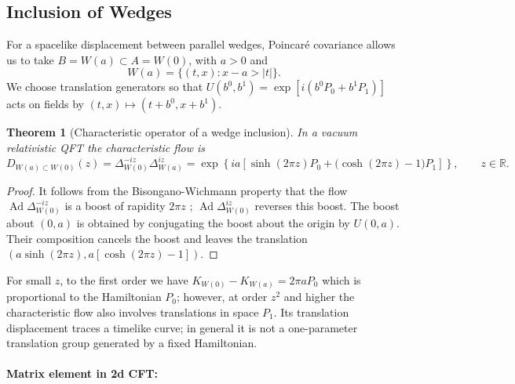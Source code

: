 \documentclass[a4paper,11pt]{article}
\newtheorem{theorem}{Theorem}
\theoremstyle{definition}
\begin{document}
\subsection{Inclusion of Wedges}
\label{subsec:wedge-inclusion}

For a spacelike displacement between parallel wedges, Poincar\'e covariance allows us to take $B=W(a)\subset A=W(0)$, with $a>0$ and
\[
 W(a)=\{(t,x):x-a>|t|\}.
\]
We choose translation generators so that $U(b^0,b^1)=\exp[i(b^0P_0+b^1P_1)]$ acts on fields by $(t,x)\mapsto(t+b^0,x+b^1)$.

\begin{theorem}[Characteristic operator of a wedge inclusion]
\label{thm:wedge-characteristic}
In a vacuum relativistic QFT the characteristic flow is
\begin{equation}
 D_{W(a)\subset W(0)}(z)=\Delta_{W(0)}^{-iz}\Delta_{W(a)}^{iz}
 =\exp\!\left\{ia\left[\sinh(2\pi z)P_0
       +\bigl(\cosh(2\pi z)-1\bigr)P_1\right]\right\},
 \qquad z\in\mathbb R.
 \label{eq:wedge-characteristic}
\end{equation}
\end{theorem}
\begin{proof}
It follows from the Bisongano-Wichmann property that the flow $\operatorname{Ad}\Delta_{W(0)}^{-iz}$ is a boost of rapidity $2\pi z$ \cite{bisognanowichmann}; $\operatorname{Ad}\Delta_{W(0)}^{iz}$ reverses this boost. The boost about $(0,a)$ is obtained by conjugating the boost about the origin by $U(0,a)$. Their composition cancels the boost and leaves the translation $(a\sinh(2\pi z),a[\cosh(2\pi z)-1])$.
\end{proof}
For small $z$, to the first order we have $K_{W(0)}-K_{W(a)}=2\pi aP_0$ which is proportional to the Hamiltonian $P_0$; however, at order $z^2$ and higher the characteristic flow 
 also involves translations in space $P_1$. Its translation displacement traces a timelike curve;
in general it is not a one-parameter translation group generated by a fixed Hamiltonian.

\paragraph{Matrix element in 2d CFT:}
\end{document}
